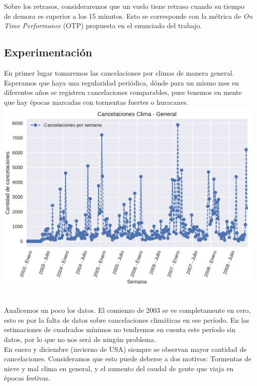 Sobre los retrasos, consideraremos que un vuelo tiene retraso cuando su tiempo de demora es superior a los 15 minutos. Esto se corresponde con la métrica de \textit{On Time Performance} (OTP) propuesta en el enunciado del trabajo. \\

\subsection{Experimentación}

En primer lugar tomaremos las cancelaciones por climas de manera general. Esperamos que haya una regularidad periódica, dónde para un mismo mes en diferentes años se registren cancelaciones comparables, pues tenemos en mente que hay épocas marcadas con tormentas fuertes o huracanes. \\

{\centering
    \includegraphics[scale=0.8]{informe/imagenes/cancelacionesClimaGeneralPlotV1.pdf} \\
}
$ $\newline

Analicemos un poco los datos. El comienzo de 2003 se ve completamente en cero, esto es por la falta de datos sobre cancelaciones climáticas en ese período. En las estimaciones de cuadrados mínimos no tendremos en cuenta este período sin datos, por lo que no nos será de ningún problema. \\

En enero y diciembre (invierno de USA) siempre se observan mayor cantidad de cancelaciones. Consideramos que esto puede deberse a dos motivos: Tormentas de nieve y mal clima en general, y el aumento del caudal de gente que viaja en épocas festivas. \\

